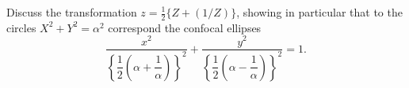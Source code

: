Discuss the transformation $z = \frac{1}{2}\{Z + (1/Z)\}$, showing in particular
that to the circles $X^{2} + Y^{2} = \alpha^{2}$ correspond the confocal ellipses
\[
\frac{x^{2}}{\left\{\dfrac{1}{2}\left(\alpha + \dfrac{1}{\alpha}\right)\right\}^{2}}
  + \frac{y^{2}}{\left\{\dfrac{1}{2}\left(\alpha - \dfrac{1}{\alpha}\right)\right\}^{2}}
  = 1.
\]

